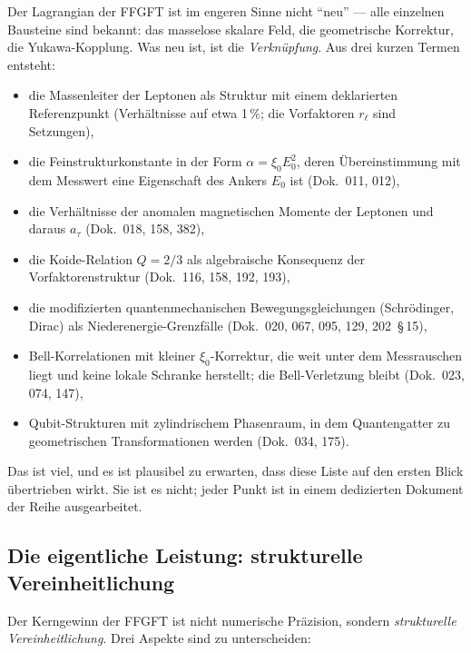 Der Lagrangian der FFGFT ist im engeren Sinne nicht
\enquote{neu} --- alle einzelnen Bausteine sind bekannt: das masselose
skalare Feld, die geometrische Korrektur, die Yukawa-Kopplung. Was
neu ist, ist die \emph{Verknüpfung}. Aus drei kurzen Termen entsteht:
\begin{itemize}
  \item die Massenleiter der Leptonen als Struktur mit einem
        deklarierten Referenzpunkt (Verhältnisse auf etwa 1\,\%;
        die Vorfaktoren $r_\ell$ sind Setzungen),
  \item die Feinstrukturkonstante in der Form $\alpha = \xi_0 E_0^2$,
        deren Übereinstimmung mit dem Messwert eine Eigenschaft des
        Ankers $E_0$ ist (Dok.~011, 012),
  \item die Verhältnisse der anomalen magnetischen Momente der
        Leptonen und daraus $a_\tau$ (Dok.~018, 158, 382),
  \item die Koide-Relation $Q = 2/3$ als algebraische Konsequenz der
        Vorfaktorenstruktur (Dok.~116, 158, 192, 193),
  \item die modifizierten quantenmechanischen Bewegungsgleichungen
        (Schrödinger, Dirac) als Niederenergie-Grenzfälle
        (Dok.~020, 067, 095, 129, 202~\S\,15),
  \item Bell-Korrelationen mit kleiner $\xi_0$-Korrektur, die weit
        unter dem Messrauschen liegt und keine lokale Schranke
        herstellt; die Bell-Verletzung bleibt (Dok.~023, 074, 147),
  \item Qubit-Strukturen mit zylindrischem Phasenraum, in dem
        Quantengatter zu geometrischen Transformationen werden
        (Dok.~034, 175).
\end{itemize}

Das ist viel, und es ist plausibel zu erwarten, dass diese Liste
auf den ersten Blick übertrieben wirkt. Sie ist es nicht; jeder
Punkt ist in einem dedizierten Dokument der Reihe ausgearbeitet.

\subsection*{Die eigentliche Leistung: strukturelle Vereinheitlichung}

Der Kerngewinn der FFGFT ist nicht numerische Präzision, sondern
\emph{strukturelle Vereinheitlichung}. Drei Aspekte sind zu
unterscheiden:

